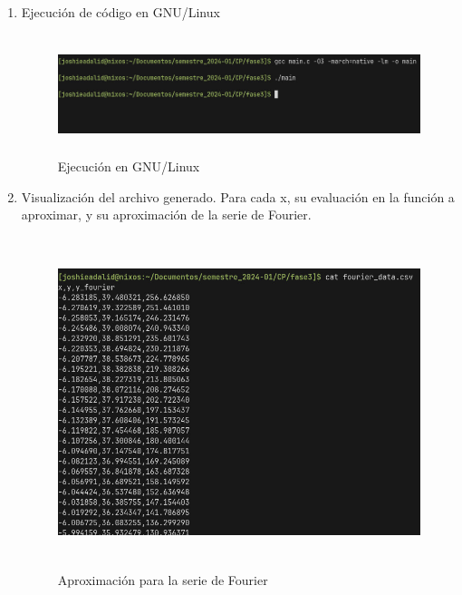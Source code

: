 \begin{enumerate} 
	\def\labelenumi{\arabic{enumi}.} 
	\item Ejecución de código en GNU/Linux
	
	\begin{figure}[H]
		\centering
		\includegraphics[width=6.26772in,height=1.375in]{media/image29.png}
		\caption{Ejecución en GNU/Linux}
	\end{figure}
	
	\item Visualización del archivo generado. Para cada x, su evaluación en la función a aproximar, y su aproximación de la serie de Fourier.
	
	\begin{figure}[H]
		\centering
		\includegraphics[width=5.16146in,height=3.79822in]{media/image37.png}
		\caption{Aproximación para la serie de Fourier}
	\end{figure}
	

\end{enumerate}
